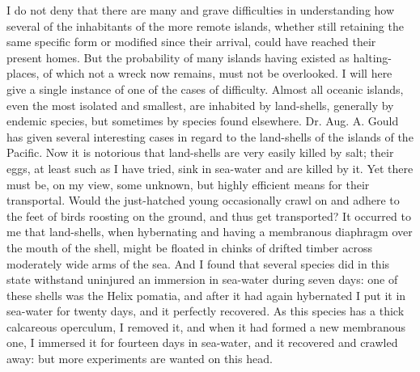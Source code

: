 \indent I do not deny that there are many and grave difficulties in understanding how several of the inhabitants of the more remote islands, whether still retaining the same specific form or modified since their arrival, could have reached their present homes. But the probability of many islands having existed as halting-places, of which not a wreck now remains, must not be overlooked. I will here give a single instance of one of the cases of difficulty.  Almost all oceanic islands, even the most isolated and smallest, are inhabited by land-shells, generally by endemic species, but sometimes by species found elsewhere. Dr. Aug. A. Gould has given several interesting cases in regard to the land-shells of the islands of the Pacific. Now it is notorious that land-shells are very easily killed by salt; their eggs, at least such as I have tried, sink in sea-water and are killed by it. Yet there must be, on my view, some unknown, but highly efficient means for their transportal.  Would the just-hatched young occasionally crawl on and adhere to the feet of birds roosting on the ground, and thus get transported? It occurred to me that land-shells, when hybernating and having a membranous diaphragm over the mouth of the shell, might be floated in chinks of drifted timber across moderately wide arms of the sea. And I found that several species did in this state withstand uninjured an immersion in sea-water during seven days: one of these shells was the Helix pomatia, and after it had again hybernated I put it in sea-water for twenty days, and it perfectly recovered. As this species has a thick calcareous operculum, I removed it, and when it had formed a new membranous one, I immersed it for fourteen days in sea-water, and it recovered and crawled away: but more experiments are wanted on this head.~\\
